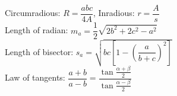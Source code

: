 Circumradious: \(R = \dfrac{abc}{4A}\), Inradious: \(r = \dfrac{A}{s}\) \\ 
Length of radian: \(m_a = \dfrac{1}{2}\sqrt{2b^2 + 2c^2 - a^2}\) \\ 
Length of bisector: \(s_a = \sqrt{bc[1 - (\dfrac{a}{b+c})^2]}\)\\
Law of tangents: \(\dfrac{a+b}{a-b} = \dfrac{\tan \frac{\alpha + \beta}{2}}{\tan \frac{\alpha - \beta}{2}}\)